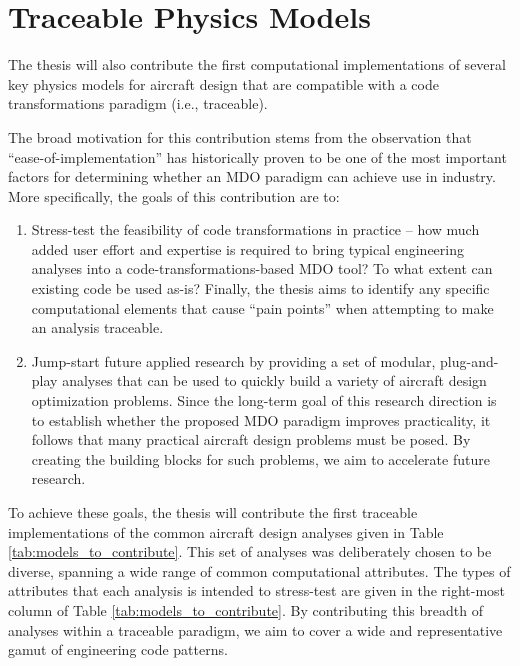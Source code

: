 \chapter{Traceable Physics Models}
\label{sec:physics_models}

The thesis will also contribute the first computational implementations of several key physics models for aircraft design that are compatible with a code transformations paradigm (i.e., traceable).

The broad motivation for this contribution stems from the observation that ``ease-of-implementation'' has historically proven to be one of the most important factors for determining whether an MDO paradigm can achieve use in industry. More specifically, the goals of this contribution are to:

\begin{enumerate}
    \item Stress-test the feasibility of code transformations in practice -- how much added user effort and expertise is required to bring typical engineering analyses into a code-transformations-based MDO tool? To what extent can existing code be used as-is? Finally, the thesis aims to identify any specific computational elements that cause ``pain points'' when attempting to make an analysis traceable.
    \item Jump-start future applied research by providing a set of modular, plug-and-play analyses that can be used to quickly build a variety of aircraft design optimization problems. Since the long-term goal of this research direction is to establish whether the proposed MDO paradigm improves practicality, it follows that many practical aircraft design problems must be posed. By creating the building blocks for such problems, we aim to accelerate future research.
\end{enumerate}

To achieve these goals, the thesis will contribute the first traceable implementations of the common aircraft design analyses given in Table \ref{tab:models_to_contribute}. This set of analyses was deliberately chosen to be diverse, spanning a wide range of common computational attributes. The types of attributes that each analysis is intended to stress-test are given in the right-most column of Table \ref{tab:models_to_contribute}. By contributing this breadth of analyses within a traceable paradigm, we aim to cover a wide and representative gamut of engineering code patterns.

